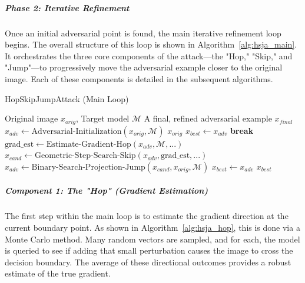 \documentclass[../main.tex]{subfiles}
\begin{document}
\subparagraph{Phase 2: Iterative Refinement}
Once an initial adversarial point is found, the main iterative refinement loop begins. The overall structure of this loop is shown in Algorithm~\ref{alg:hsja_main}. It orchestrates the three core components of the attack—the "Hop," "Skip," and "Jump"—to progressively move the adversarial example closer to the original image. Each of these components is detailed in the subsequent algorithms.

\begin{breakablealgorithm}{HopSkipJumpAttack (Main Loop)}
\label{alg:hsja_main}
\begin{algorithmic}[1]
\Require Original image $x_{orig}$, Target model $\mathcal{M}$
\Ensure A final, refined adversarial example $x_{final}$
\State $x_{adv} \gets \text{Adversarial-Initialization}(x_{orig}, \mathcal{M})$ 
 \Return $x_{orig}$ \EndIf
\State $x_{best} \gets x_{adv}$
     \textbf{break} \EndIf
    \State $\text{grad\_est} \gets \text{Estimate-Gradient-Hop}(x_{adv}, \mathcal{M}, ...)$ 
    \State $x_{cand} \gets \text{Geometric-Step-Search-Skip}(x_{adv}, \text{grad\_est}, ...)$ 
    \State $x_{adv} \gets \text{Binary-Search-Projection-Jump}(x_{cand}, x_{orig}, \mathcal{M})$ 
        \State $x_{best} \gets x_{adv}$
    \EndIf
\EndFor
\State \Return $x_{best}$
\end{algorithmic}
\end{breakablealgorithm}

\subparagraph{Component 1: The "Hop" (Gradient Estimation)}
The first step within the main loop is to estimate the gradient direction at the current boundary point. As shown in Algorithm~\ref{alg:hsja_hop}, this is done via a Monte Carlo method. Many random vectors are sampled, and for each, the model is queried to see if adding that small perturbation causes the image to cross the decision boundary. The average of these directional outcomes provides a robust estimate of the true gradient.
\end{document}
